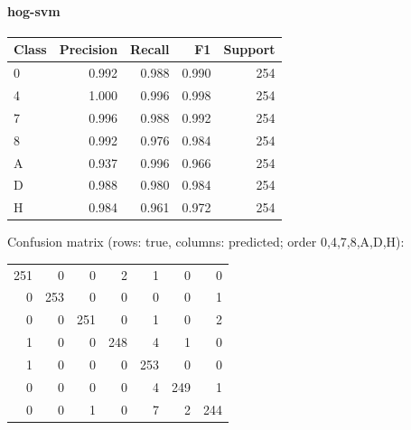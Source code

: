 \paragraph{hog-svm}\begin{center}\begin{tabular}{lrrrr}\toprule Class & Precision & Recall & F1 & Support \\ \midrule
0 & 0.992 & 0.988 & 0.990 & 254 \\
4 & 1.000 & 0.996 & 0.998 & 254 \\
7 & 0.996 & 0.988 & 0.992 & 254 \\
8 & 0.992 & 0.976 & 0.984 & 254 \\
A & 0.937 & 0.996 & 0.966 & 254 \\
D & 0.988 & 0.980 & 0.984 & 254 \\
H & 0.984 & 0.961 & 0.972 & 254 \\
\bottomrule\end{tabular}\end{center}
\noindent Confusion matrix (rows: true, columns: predicted; order 0,4,7,8,A,D,H):
\begin{center}\begin{tabular}{rrrrrrr}
251 & 0 & 0 & 2 & 1 & 0 & 0 \\
0 & 253 & 0 & 0 & 0 & 0 & 1 \\
0 & 0 & 251 & 0 & 1 & 0 & 2 \\
1 & 0 & 0 & 248 & 4 & 1 & 0 \\
1 & 0 & 0 & 0 & 253 & 0 & 0 \\
0 & 0 & 0 & 0 & 4 & 249 & 1 \\
0 & 0 & 1 & 0 & 7 & 2 & 244 \\
\end{tabular}\end{center}
